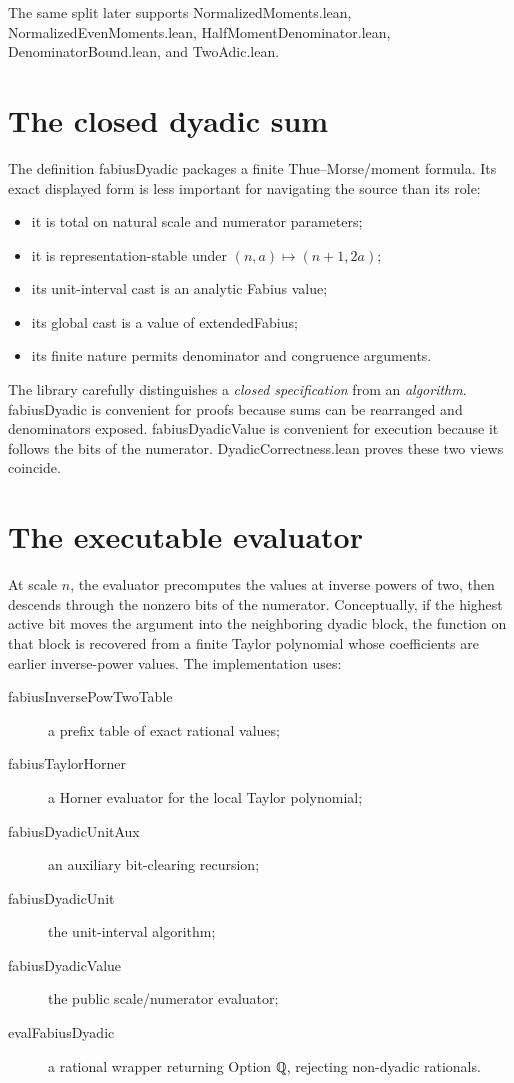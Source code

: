 \documentclass[11pt,a4paper,openany]{book}
\def\module#1{#1.lean}
\def\decl#1{#1}
\def\code#1{#1}
\newcommand{\module}[1]{\nolinkurl{#1.lean}}
\newcommand{\decl}[1]{\texttt{\detokenize{#1}}}
\newcommand{\code}[1]{\texttt{\detokenize{#1}}}
\begin{document}
The same split later supports \module{NormalizedMoments},
\module{NormalizedEvenMoments}, \module{HalfMomentDenominator},
\module{DenominatorBound}, and \module{TwoAdic}.

\section{The closed dyadic sum}
The definition \decl{fabiusDyadic} packages a finite Thue--Morse/moment formula.
Its exact displayed form is less important for navigating the source than its
role:
\begin{itemize}
  \item it is total on natural scale and numerator parameters;
  \item it is representation-stable under $(n,a)\mapsto(n+1,2a)$;
  \item its unit-interval cast is an analytic Fabius value;
  \item its global cast is a value of \decl{extendedFabius};
  \item its finite nature permits denominator and congruence arguments.
\end{itemize}

The library carefully distinguishes a \emph{closed specification} from an
\emph{algorithm}.  \decl{fabiusDyadic} is convenient for proofs because sums
can be rearranged and denominators exposed.  \decl{fabiusDyadicValue} is
convenient for execution because it follows the bits of the numerator.
\module{DyadicCorrectness} proves these two views coincide.

\section{The executable evaluator}
At scale $n$, the evaluator precomputes the values at inverse powers of two,
then descends through the nonzero bits of the numerator.  Conceptually, if the
highest active bit moves the argument into the neighboring dyadic block, the
function on that block is recovered from a finite Taylor polynomial whose
coefficients are earlier inverse-power values.  The implementation uses:
\begin{description}
\item[\decl{fabiusInversePowTwoTable}] a prefix table of exact rational values;
\item[\decl{fabiusTaylorHorner}] a Horner evaluator for the local Taylor
polynomial;
\item[\decl{fabiusDyadicUnitAux}] an auxiliary bit-clearing recursion;
\item[\decl{fabiusDyadicUnit}] the unit-interval algorithm;
\item[\decl{fabiusDyadicValue}] the public scale/numerator evaluator;
\item[\decl{evalFabiusDyadic}] a rational wrapper returning \code{Option ℚ},
rejecting non-dyadic rationals.
\end{description}
\end{document}
